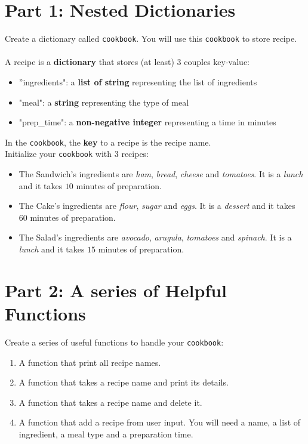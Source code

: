 \documentclass{42-en}
\begin{document}
\section*{Part 1: Nested Dictionaries}

Create a dictionary called \texttt{cookbook}. You will use this \texttt{cookbook} to store recipe.
\\\\
A recipe is a \textbf{dictionary} that stores (at least) 3 couples key-value:
\begin{itemize}
	\item ''ingredients": a \textbf{list of string} representing the list of ingredients
	\item "meal": a \textbf{string} representing the type of meal
	\item "prep\_time": a \textbf{non-negative integer} representing a time in minutes
\end{itemize}

In the \texttt{cookbook}, the  \textbf{key} to a recipe is the recipe name.
\\
Initialize your \texttt{cookbook} with 3 recipes:
\begin{itemize}
	\item The Sandwich's ingredients are \textit{ham}, \textit{bread}, \textit{cheese} and \textit{tomatoes}.
It is a \textit{lunch} and it takes $10$ minutes of preparation.
	\item The Cake's ingredients are \textit{flour}, \textit{sugar} and \textit{eggs}.
It is a \textit{dessert} and it takes $60$ minutes of preparation.
	\item The Salad's ingredients are \textit{avocado}, \textit{arugula}, \textit{tomatoes} and \textit{spinach}.
It is a \textit{lunch} and it takes $15$ minutes of preparation.
\end{itemize}

\section*{Part 2: A series of Helpful Functions}

Create a series of useful functions to handle your \texttt{cookbook}:

\begin{enumerate}
	\item A function that print all recipe names.
	\item A function that takes a recipe name and print its details.
	\item A function that takes a recipe name and delete it.
	\item A function that add a recipe from user input. You will need a name, a list of ingredient, a meal type and a preparation time.
\end{enumerate}
\end{document}
